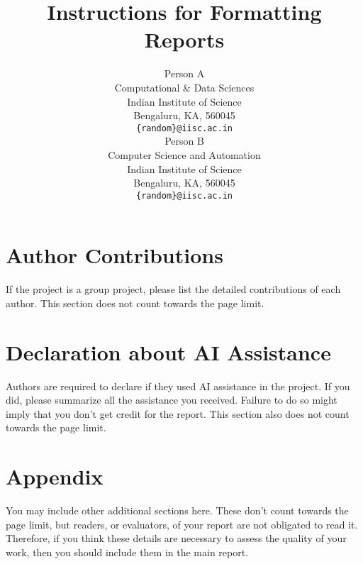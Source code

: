\documentclass{article} %
\title{Instructions for Formatting Reports}
\author{Person A   \\
Computational \& Data Sciences\\
Indian Institute of Science \\
Bengaluru, KA, 560045 \\
\texttt{\{random\}@iisc.ac.in} \\
\And
Person B \\
Computer Science and Automation \\
Indian Institute of Science \\
Bengaluru, KA, 560045 \\
\texttt{\{random\}@iisc.ac.in} \\
}
\begin{document}
\ifcolmsubmission
\linenumbers
\fi

\maketitle









\section*{Author Contributions}
If the project is a group project, please list the detailed contributions of each author.
This section does not count towards the page limit.

\section*{Declaration about AI Assistance}
Authors are required to declare if they used AI assistance in the project. 
If you did, please summarize all the assistance you received.  
Failure to do so might imply that you don't get credit for the report. 
This section also does not count towards the page limit.









\appendix
\newpage
\section{Appendix}
You may include other additional sections here. These don't count towards the page limit, 
but readers, or evaluators, of your report are not obligated to read it. Therefore, 
if you think these details are necessary to assess the quality of your work, 
then you should include them in the main report.
\end{document}
